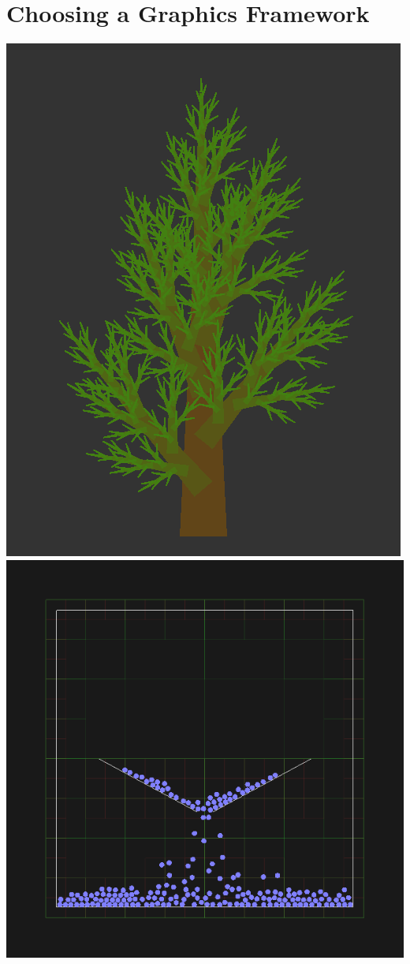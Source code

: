 \section{Choosing a Graphics Framework}


\begin{marginfigure}
	\includegraphics{res/gloss/gloss-tree.png}
	\vspace{1em}
	\includegraphics{res/gloss/gloss-styrene.png}

\end{marginfigure}
